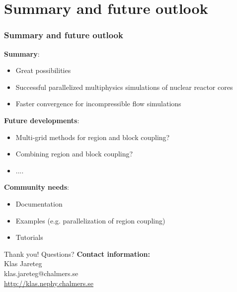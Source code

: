 \documentclass[9pt,handout]{beamer} %
\begin{document}

\section{Summary and future outlook}
\begin{frame}%
\frametitle{Summary and future outlook}
\textbf{Summary}:
\begin{itemize}
    \item Great possibilities
    \item Successful parallelized multiphysics simulations of nuclear reactor cores
    \item Faster convergence for incompressible flow simulations
\end{itemize}
\pause
\vskip10pt
\textbf{Future developments}:
\begin{itemize}
    \item Multi-grid methods for region and block coupling?
    \item Combining region and block coupling?
    \item .... 
\end{itemize}
\pause
\vskip10pt
\textbf{Community needs}:
\begin{itemize}
    \item Documentation 
    \item Examples (e.g. parallelization of region coupling)
    \item Tutorials
\end{itemize}
\end{frame}



\begin{frame}

{\Huge Thank you! Questions?}
\vfill
{\bf Contact information:}\\
Klas Jareteg\\
klas.jareteg@chalmers.se\\
\url{http://klas.nephy.chalmers.se}
\end{frame}
\end{document}
